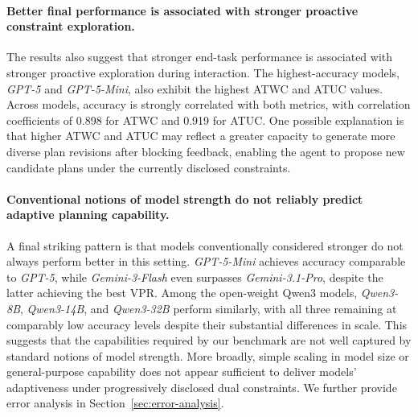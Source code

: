 \paragraph{Better final performance is associated with stronger proactive constraint exploration.}
The results also suggest that stronger end-task performance is associated with stronger proactive exploration during interaction.
The highest-accuracy models, \textit{GPT-5} and \textit{GPT-5-Mini}, also exhibit the highest ATWC and ATUC values.
Across models, accuracy is strongly correlated with both metrics, with correlation coefficients of 0.898 for ATWC and 0.919 for ATUC.
One possible explanation is that higher ATWC and ATUC may reflect a greater capacity to generate more diverse plan revisions after blocking feedback, enabling the agent to propose new candidate plans under the currently disclosed constraints.

\paragraph{Conventional notions of model strength do not reliably predict adaptive planning capability.}
A final striking pattern is that models conventionally considered stronger do not always perform better in this setting. 
\textit{GPT-5-Mini} achieves accuracy comparable to \textit{GPT-5}, while \textit{Gemini-3-Flash} even surpasses \textit{Gemini-3.1-Pro}, despite the latter achieving the best VPR.
Among the open-weight Qwen3 models, \textit{Qwen3-8B}, \textit{Qwen3-14B}, and \textit{Qwen3-32B} perform similarly, with all three remaining at comparably low accuracy levels despite their substantial differences in scale.
This suggests that the capabilities required by our benchmark are not well captured by standard notions of model strength. 
More broadly, simple scaling in model size or general-purpose capability does not appear sufficient to deliver models' adaptiveness under progressively disclosed dual constraints.
We further provide error analysis in Section~\ref{sec:error-analysis}. 






